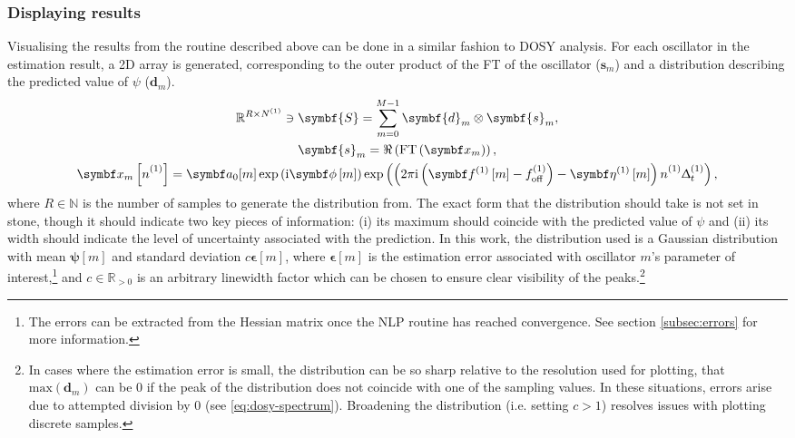\subsubsection{Displaying results}
Visualising the results from the routine described above can be done in a
similar fashion to \ac{DOSY} analysis. For each oscillator in the estimation
result, a \ac{2D} array is generated, corresponding to the outer product of the
\ac{FT} of the oscillator ($\symbf{s}_m$) and a distribution describing the
predicted value of $\psi$ ($\symbf{d}_m$).
\begin{subequations}
    \begin{gather}
        \mathbb{R}^{R \times \None} \ni \symbf{S} = \sum_{m=0}^{M-1}
        \symbf{d}_m \otimes
        \symbf{s}_m ,\label{eq:dosy-spectrum}\\
        \symbf{s}_m = \Re\left(\FT\left(\bx_m\right)\right),\\
        \bx_m\left[\none\right] = \bda_0[m] \exp\left(\iu \bdphim\right)
        \exp\left(\left(2 \pi \iu \left(\bdfonem - \foffone\right) - \bdetaonem \right) \none \Dtone\right),
    \end{gather}
    \label{eq:dosy-cross-product}
\end{subequations}
where $R \in \mathbb{N}$ is the number of samples to generate the distribution from.
The exact form that the distribution should take is not set in stone, though it
should indicate two key pieces of information:
(i) its maximum should coincide with the predicted value of $\psi$ and (ii) its
width should indicate the level of uncertainty associated with the prediction.
In this work, the
distribution used is a Gaussian distribution with mean $\symbf{\psi}[m]$ and standard
deviation $c \symbf{\epsilon}[m]$, where $\symbf{\epsilon}[m]$ is the
estimation error associated with oscillator $m$'s parameter of
interest,\footnote{
    The errors can be extracted from the Hessian matrix once the \ac{NLP}
    routine has reached convergence. See section \ref{subsec:errors} for more
    information.
}
and $c \in \mathbb{R}_{>0}$ is an arbitrary linewidth factor which can be chosen
to ensure clear visibility of the peaks.\footnote{
    In cases where the estimation error is small, the distribution can be
    so sharp relative to the resolution used for plotting, that
    $\text{max}(\symbf{d}_m)$ can be $0$ if the peak of the distribution does
    not coincide with one of the sampling values. In these situations, errors
    arise due to attempted division by $0$ (see \eqref{eq:dosy-spectrum}).
    Broadening the distribution (i.e. setting $c > 1$) resolves issues with
    plotting discrete samples.
}
